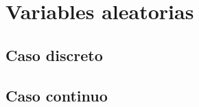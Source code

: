 \documentclass[11pt]{report}
\theoremstyle{break}
\theoremstyle{break}
\begin{document}
\chapter{Variables aleatorias}
\label{capitulo:variables aleatorias}

\section{Caso discreto}
\label{seccion:variables discretas}

\section{Caso continuo}
\label{seccion:variables continuas}
\end{document}
